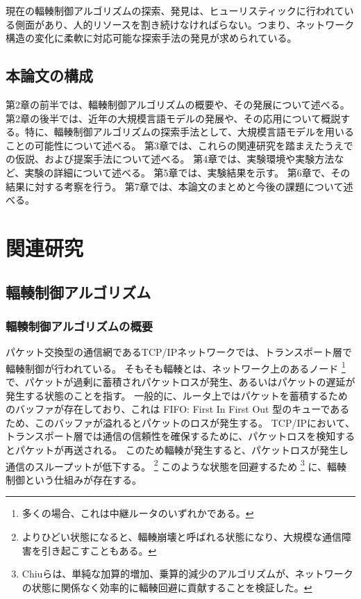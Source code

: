 \documentclass[a4paper,11pt]{jreport}
\begin{document}
現在の輻輳制御アルゴリズムの探索、発見は、ヒューリスティックに行われている側面があり、人的リソースを割き続けなければらない。つまり、ネットワーク構造の変化に柔軟に対応可能な探索手法の発見が求められている。

\newpage

\section{本論文の構成}

第2章の前半では、輻輳制御アルゴリズムの概要や、その発展について述べる。
第2章の後半では、近年の大規模言語モデルの発展や、その応用について概説する。特に、輻輳制御アルゴリズムの探索手法として、大規模言語モデルを用いることの可能性について述べる。
第3章では、これらの関連研究を踏まえたうえでの仮説、および提案手法について述べる。
第4章では、実験環境や実験方法など、実験の詳細について述べる。
第5章では、実験結果を示す。
第6章で、その結果に対する考察を行う。
第7章では、本論文のまとめと今後の課題について述べる。

\newpage

\chapter{関連研究}
\section{輻輳制御アルゴリズム}

\subsection{輻輳制御アルゴリズムの概要}

パケット交換型の通信網であるTCP/IPネットワークでは、トランスポート層で輻輳制御が行われている。
そもそも輻輳とは、ネットワーク上のあるノード
\footnote{多くの場合、これは中継ルータのいずれかである。}
で、パケットが過剰に蓄積されパケットロスが発生、あるいはパケットの遅延が発生する状態のことを指す。
一般的に、ルータ上ではパケットを蓄積するためのバッファが存在しており、これは FIFO: First In First Out 型のキューであるため、このバッファが溢れるとパケットのロスが発生する。
TCP/IPにおいて、トランスポート層では通信の信頼性を確保するために、パケットロスを検知するとパケットが再送される。
このため輻輳が発生すると、パケットロスが発生し通信のスループットが低下する。
\footnote{よりひどい状態になると、輻輳崩壊と呼ばれる状態になり、大規模な通信障害を引き起こすこともある。}
このような状態を回避するため
\footnote{Chiuら\cite{CHIU19891}は、単純な加算的増加、乗算的減少のアルゴリズムが、ネットワークの状態に関係なく効率的に輻輳回避に貢献することを検証した。}
に、輻輳制御という仕組みが存在する。
\end{document}

